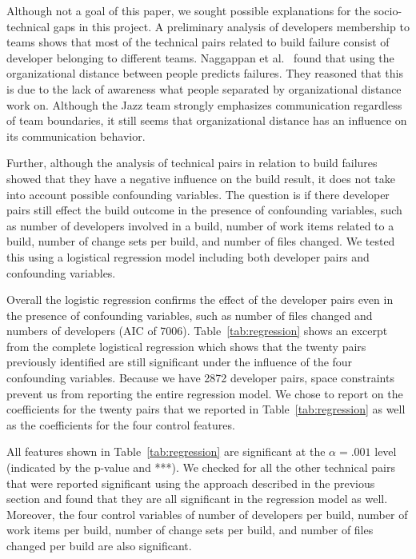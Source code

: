 \documentclass[12pt,oneside]{book}
\begin{document}
Although not a goal of this paper, we sought possible explanations for the
socio-technical gaps in this project. A preliminary analysis of developers
membership to teams shows that most
of the technical pairs related to build failure consist of developer belonging to
different teams. Naggappan et al.~\cite{nagappan:icse:2008} found that using the
organizational distance between people predicts failures. They reasoned that this
is due to the lack of awareness what people separated by organizational distance
work on. Although the Jazz team strongly emphasizes communication
regardless of team boundaries, it still seems that organizational distance has
an influence on its communication behavior.

Further, although the analysis of technical pairs in relation to build failures
showed that they have a negative influence on the build result, it does not take
into account possible confounding variables. The question is if there developer pairs still effect the build outcome in the presence of confounding variables, such as number of developers involved in a build, number of work items
related to a build, number of change sets per build, and number of files changed.
We tested this using a logistical regression model including both developer pairs and confounding variables.

Overall the logistic regression confirms the effect of the developer pairs
even in the presence of confounding variables, such as number of files changed
and numbers of developers (AIC of 7006). 
Table~\ref{tab:regression} shows an excerpt from the complete logistical
regression which shows that the twenty pairs previously identified are still
significant under the influence of the four confounding variables. Because we have 2872 developer pairs, space constraints prevent us from reporting the entire regression model. We chose to report on the coefficients for the twenty pairs that we reported in Table~\ref{tab:regression} as well as the coefficients for the four control features.

All features shown in Table~\ref{tab:regression} are significant at the $\alpha=.001$ level (indicated by the p-value and ***).
We checked for all the other technical pairs that were reported significant using the approach described in the previous section and found that they are all significant in the regression model as well.
Moreover, the four control variables of number of developers per build, number
of work items per build, number of change sets per build, and number of files changed per build are also significant.
\end{document}
